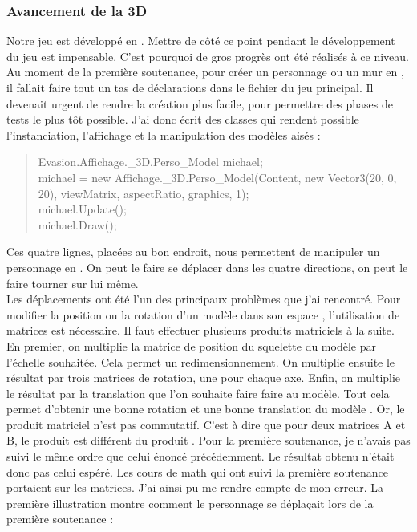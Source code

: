\documentclass{article}
\begin{document}
\subsubsection{Avancement de la 3D}
Notre jeu est développé en . Mettre de côté ce point pendant le développement du jeu est impensable. C'est pourquoi de gros progrès ont été réalisés à ce niveau. Au moment de la première soutenance, pour créer un personnage ou un mur en , il fallait faire tout un tas de déclarations dans le fichier du jeu principal. Il devenait urgent de rendre la création  plus facile, pour permettre des phases de tests le plus tôt possible. J'ai donc écrit des classes qui rendent possible l'instanciation, l'affichage et la manipulation des modèles  aisés :

\begin{quote}
\textcolor{texteGris}{
Evasion.Affichage.\_3D.Perso\_Model michael;\\
michael = new Affichage.\_3D.Perso\_Model(Content, new Vector3(20, 0, 20), viewMatrix, aspectRatio, graphics, 1);\\
michael.Update();\\
michael.Draw();}
\end{quote}

Ces quatre lignes, placées au bon endroit, nous permettent de manipuler un personnage en . On peut le faire se déplacer dans les quatre directions, on peut le faire tourner sur lui même.\\

Les déplacements ont été l'un des principaux problèmes que j'ai rencontré. Pour modifier la position ou la rotation d'un modèle dans son espace , l'utilisation de matrices est nécessaire. Il faut effectuer plusieurs produits matriciels à la suite. En premier, on multiplie la matrice de position du squelette du modèle par l'échelle souhaitée. Cela permet un redimensionnement. On multiplie ensuite le résultat par trois matrices de rotation, une pour chaque axe. Enfin, on multiplie le résultat par la translation que l'on souhaite faire faire au modèle. Tout cela permet d'obtenir une bonne rotation et une bonne translation du modèle . 
Or, le produit matriciel n'est pas commutatif. C'est à dire que pour deux matrices A et B, le produit  est différent du produit . Pour la première soutenance, je n'avais pas suivi le même ordre que celui énoncé précédemment. Le résultat obtenu n'était donc pas celui espéré. Les cours de math qui ont suivi la première soutenance portaient sur les matrices. J'ai ainsi pu me rendre compte de mon erreur. La première illustration montre comment le personnage se déplaçait lors de la première soutenance : 
\end{document}
